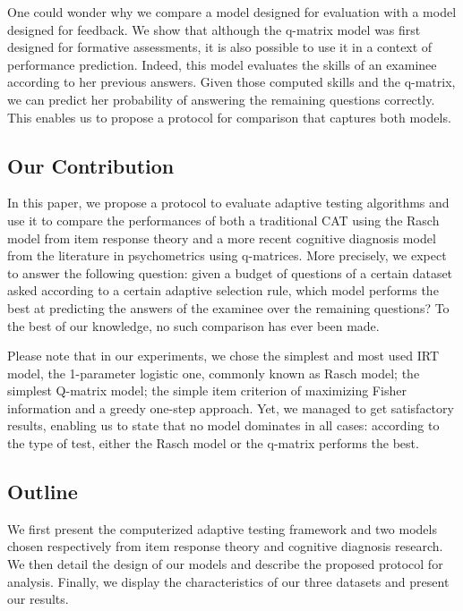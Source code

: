 \documentclass{edm_template}
\begin{document}
One could wonder why we compare a model designed for evaluation with a model designed for feedback. We show that although the q-matrix model was first designed for formative assessments, it is also possible to use it in a context of performance prediction. Indeed, this model evaluates the skills of an examinee according to her previous answers. Given those computed skills and the q-matrix, we can predict her probability of answering the remaining questions correctly. This enables us to propose a protocol for comparison that captures both models.


\subsection{Our Contribution}

In this paper, we propose a protocol to evaluate adaptive testing algorithms and use it to compare the performances of both a traditional CAT using the Rasch model from item response theory and a more recent cognitive diagnosis model from the literature in psychometrics using q-matrices. More precisely, we expect to answer the following question: given a budget of questions of a certain dataset asked according to a certain adaptive selection rule, which model performs the best at predicting the answers of the examinee over the remaining questions? To the best of our knowledge, no such comparison has ever been made.

Please note that in our experiments, we chose the simplest and most used IRT model, the 1-parameter logistic one, commonly known as Rasch model; the simplest Q-matrix model; the simple item criterion of maximizing Fisher information and a greedy one-step approach. Yet, we managed to get satisfactory results, enabling us to state that no model dominates in all cases: according to the type of test, either the Rasch model or the q-matrix performs the best.

\subsection{Outline}

We first present the computerized adaptive testing framework and two models chosen respectively from item response theory and cognitive diagnosis research. We then detail the design of our models and describe the proposed protocol for analysis. Finally, we display the characteristics of our three datasets and present our results.
\end{document}
